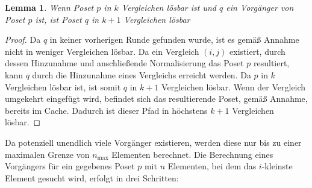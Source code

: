 \documentclass[10pt,journal,compsoc]{IEEEtran}
\newtheorem{lemma}{Lemma}
\begin{document}
\begin{lemma} \label{lemma:predecessor_calculation}
  Wenn Poset $p$ in $k$ Vergleichen lösbar ist und $q$ ein Vorgänger von Poset $p$ ist, ist Poset $q$ in $k + 1$ Vergleichen lösbar
\end{lemma}

\begin{proof} \label{proof:predecessor_calculation}
  Da $q$ in keiner vorherigen Runde gefunden wurde, ist es gemäß Annahme nicht in weniger Vergleichen lösbar.
  Da ein Vergleich $(i, j)$ existiert, durch dessen Hinzunahme und anschließende Normalisierung das Poset $p$ resultiert, kann $q$ durch die Hinzunahme eines Vergleichs erreicht werden.
  Da $p$ in $k$ Vergleichen lösbar ist, ist somit $q$ in $k + 1$ Vergleichen lösbar.
  Wenn der Vergleich umgekehrt eingefügt wird, befindet sich das resultierende Poset, gemäß Annahme, bereits im Cache.
  Dadurch ist dieser Pfad in höchstens $k + 1$ Vergleichen lösbar.
\end{proof}

Da potenziell unendlich viele Vorgänger existieren, werden diese nur bis zu einer maximalen Grenze von $n_{\text{max}}$ Elementen berechnet.
Die Berechnung eines Vorgängers für ein gegebenes Poset $p$ mit $n$ Elementen, bei dem das $i$-kleinste Element gesucht wird, erfolgt in drei Schritten:
\end{document}
